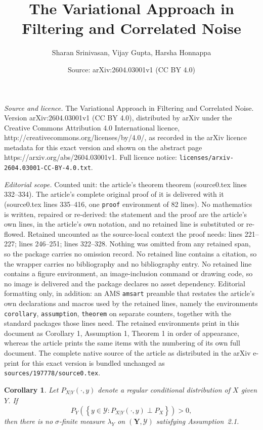 \documentclass[10pt,a4paper]{amsart}
\title{The Variational Approach in Filtering and Correlated Noise}
\author{Sharan Srinivasan, Vijay Gupta, Harsha Honnappa}
\date{Source: arXiv:2604.03001v1 (CC BY 4.0)}
\newtheorem{corollary}{Corollary}
\newcommand{\ms}[1]{(\mathbf{#1},\mathcal{#1})}
\begin{document}
\maketitle

\noindent\emph{Source and licence.} The Variational Approach in Filtering and Correlated Noise. Version arXiv:2604.03001v1 (CC BY 4.0), distributed by arXiv under the Creative Commons Attribution 4.0 International licence, http://creativecommons.org/licenses/by/4.0/, as recorded in the arXiv licence metadata for this exact version and shown on the abstract page https://arxiv.org/abs/2604.03001v1. Full licence notice: \texttt{licenses/arxiv-2604.03001-CC-BY-4.0.txt}.\par\smallskip

\noindent\textit{Editorial scope.} Counted unit: the article's theorem theorem (source0.tex lines 332--334). The article's complete original proof of it is delivered with it (source0.tex lines 335--416, one \texttt{proof} environment of 82 lines). No mathematics is written, repaired or re-derived: the statement and the proof are the article's own lines, in the article's own notation, and no retained line is substituted or re-flowed.  Retained uncounted as the source-local context the proof needs: lines 221--227; lines 246--251; lines 322--328.  Nothing was omitted from any retained span, so the package carries no omission record.  No retained line contains a citation, so the wrapper carries no bibliography and no bibliography entry.  No retained line contains a figure environment, an image-inclusion command or drawing code, so no image is delivered and the package declares no asset dependency.  Editorial formatting only, in addition: an AMS \texttt{amsart} preamble that restates the article's own declarations and macros used by the retained lines, namely the environments \texttt{corollary}, \texttt{assumption}, \texttt{theorem} on separate counters, together with the standard packages those lines need.  The retained environments print in this document as Corollary 1, Assumption 1, Theorem 1 in order of appearance, whereas the article prints the same items with the numbering of its own full document.  The complete native source of the article as distributed in the arXiv e-print for this exact version is bundled unchanged as \texttt{sources/197778/source0.tex}.
\begin{corollary}\label{cor:abstract}
    Let $P_{X|Y}(\cdot, y)$ denote a regular conditional distribution of $X$ given $Y$. If
    \[
        P_Y\!\left(\left\{ y \in \mathcal{Y} : P_{X|Y}(\cdot, y) \perp P_X \right\}\right) > 0,
    \]
    then there is no $\sigma$-finite measure $\lambda_Y$ on $\ms{Y}$ satisfying Assumption~2.1.
\end{corollary}
\end{document}
